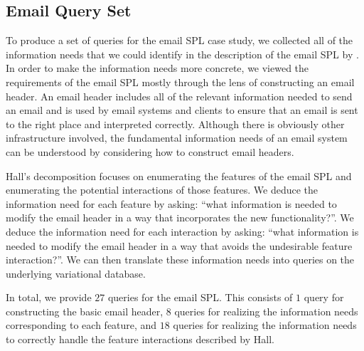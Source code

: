 \subsection{Email Query Set}
\label{sec:enron-qs}


To produce a set of queries for the email SPL case study, we collected all of
the information needs that we could identify in the description of the email
SPL by \citet{Hall05}. In order to make the information needs more concrete, we
viewed the requirements of the email SPL mostly through the lens of
constructing an email header.
%
An email header includes all of the relevant information needed to send an
email and is used by email systems and clients to ensure that an email is sent to
the right place and interpreted correctly. 
%
Although there is obviously other infrastructure involved, the fundamental
information needs of an email system can be understood by considering how to
construct email headers.


Hall's decomposition focuses on enumerating the features of the email SPL and
enumerating the potential interactions of those features.
%
We deduce the information need for each feature by asking: ``what information
is needed to modify the email header in a way that incorporates the new
functionality?''. We deduce the information need for each interaction by
asking: ``what information is needed to modify the email header in a way that
avoids the undesirable feature interaction?''.
%
We can then translate these information needs into queries on the underlying
variational database.


In total, we provide $27$ queries for the email SPL.
%
%
This consists of $1$ query for constructing the basic email header, $8$ queries
for realizing the information needs corresponding to each feature, and $18$
queries for realizing the information needs to correctly handle the feature
interactions described by Hall.


